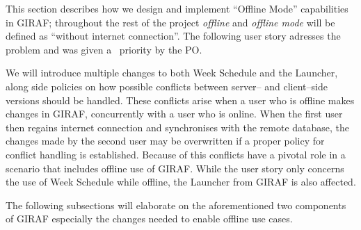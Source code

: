 This section describes how we design and implement \enquote{Offline Mode} capabilities in GIRAF; throughout the rest of the project \textit{offline} and \textit{offline mode} will be defined as \enquote{without internet connection}.
The following user story adresses the problem and was given a \phigh~priority by the PO.

\begin{center}
\end{center}

We will introduce multiple changes to both Week Schedule and the Launcher, along side policies on how possible conflicts between server-- and client--side versions should be handled.
These conflicts arise when a user who is offline makes changes in GIRAF, concurrently with a user who is online.
When the first user then regains internet connection and synchronises with the remote database, the changes made by the second user may be overwritten if a proper policy for conflict handling is established.
Because of this conflicts have a pivotal role in a scenario that includes offline use of GIRAF.
While the user story only concerns the use of Week Schedule while offline, the Launcher from GIRAF is also affected.

The following subsections will elaborate on the aforementioned two components of GIRAF especially the changes needed to enable offline use cases.